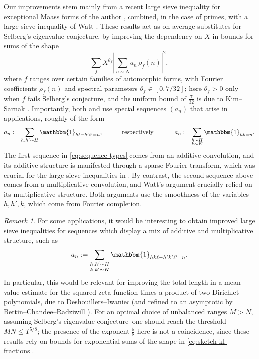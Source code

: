 \documentclass[reqno,11pt]{amsart}
\theoremstyle{remark}
\newtheorem*{remark}{Remark}
\numberwithin{equation}{section}
\newcommand{\one}{\mathbbm{1}}
\begin{document}
Our improvements stem mainly from a recent large sieve inequality for exceptional Maass forms of the author \cite[Theorem 3]{pascadi2024large}, combined, in the case of primes, with a large sieve inequality of Watt \cite[Theorem 2]{watt1995kloosterman}. These results act as on-average substitutes for Selberg's eigenvalue conjecture, by improving the dependency on $X$ in bounds for sums of the shape
\begin{equation} \label{eq:sketch-large-sieve}
    \sum_f X^{\theta_f} \left\vert \sum_{n \sim N} a_n\, \rho_f(n) \right\vert^2,
\end{equation}
where $f$ ranges over certain families of automorphic forms, with Fourier coefficients $\rho_f(n)$ and spectral parameters $\theta_f \in [0, 7/32]$; here $\theta_f > 0$ only when $f$ fails Selberg's conjecture, and the uniform bound of $\tfrac{7}{32}$ is due to Kim--Sarnak \cite[Appendix 2]{kim2003functoriality}. Importantly, both \cite[Theorem 3]{pascadi2024large} and \cite[Theorem 2]{watt1995kloosterman} use special sequences $(a_n)$ that arise in applications, roughly of the form
\begin{equation} \label{eq:sequence-types}
    a_n := \sum_{h, h' \sim H} \one_{h\ell-h'\ell' = n},
    \qquad\quad 
    \text{respectively}\  
    \qquad\quad
    a_n := \sum_{\substack{h \sim H \\ k \sim K}} \one_{hk = n}.
\end{equation}
The first sequence in \cref{eq:sequence-types} comes from an additive convolution, and its additive structure is manifested through a sparse Fourier transform, which was crucial for the large sieve inequalities in \cite{pascadi2024large}. By contrast, the second sequence above comes from a multiplicative convolution, and Watt's argument \cite[Section 2]{watt1995kloosterman} crucially relied on its multiplicative structure. Both arguments use the smoothness of the variables $h, h', k$, which come from Fourier completion.
\begin{remark} 
For some applications, it would be interesting to obtain improved large sieve inequalities for sequences which display a mix of additive and multiplicative structure, such as 
\[
    a_n := \sum_{\substack{h, h' \sim H \\ k, k' \sim K}} \one_{hk\ell - h'k'\ell' = n}.
\]
In particular, this would be relevant for improving the total length in a mean-value estimate for the squared zeta function times a product of two Dirichlet polynomials, due to Deshouillers--Iwaniec \cite[Theorem 2]{deshouillers1984power} (and refined to an asymptotic by Bettin--Chandee--Radziwill \cite{bettin2017mean}). For an optimal choice of unbalanced ranges $M > N$, assuming Selberg's eigenvalue conjecture, one should reach the threshold $MN \le T^{5/8}$; the presence of the exponent $\tfrac{5}{8}$ here is not a coincidence, since these results rely on bounds for exponential sums of the shape in \cref{eq:sketch-kl-fractions}.
\end{remark}
\end{document}

